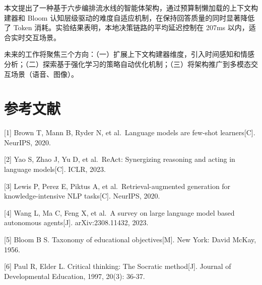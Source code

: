 \documentclass{harryopo-mathnotes}
\begin{document}
本文提出了一种基于六步编排流水线的智能体架构，通过预算制懒加载的上下文构建器和
Bloom 认知层级驱动的难度自适应机制，在保持回答质量的同时显著降低了 Token
消耗。实验结果表明，本地决策链路的平均延迟控制在 207ms
以内，适合实时交互场景。

未来的工作将聚焦三个方向：（一）扩展上下文构建器维度，引入时间感知和情感分析；（二）探索基于强化学习的策略自动优化机制；（三）将架构推广到多模态交互场景（语音、图像）。

\section{参考文献}\label{ux53c2ux8003ux6587ux732e}

{[}1{]} Brown T, Mann B, Ryder N, et al.~Language models are few-shot
learners{[}C{]}. NeurIPS, 2020.

{[}2{]} Yao S, Zhao J, Yu D, et al.~ReAct: Synergizing reasoning and
acting in language models{[}C{]}. ICLR, 2023.

{[}3{]} Lewis P, Perez E, Piktus A, et al.~Retrieval-augmented
generation for knowledge-intensive NLP tasks{[}C{]}. NeurIPS, 2020.

{[}4{]} Wang L, Ma C, Feng X, et al.~A survey on large language model
based autonomous agents{[}J{]}. arXiv:2308.11432, 2023.

{[}5{]} Bloom B S. Taxonomy of educational objectives{[}M{]}. New York:
David McKay, 1956.

{[}6{]} Paul R, Elder L. Critical thinking: The Socratic method{[}J{]}.
Journal of Developmental Education, 1997, 20(3): 36-37.
\end{document}
